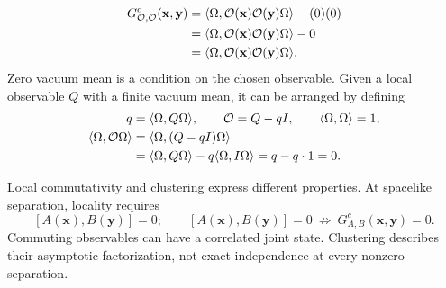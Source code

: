 \begin{align}
 G^c_{\mathcal O,\mathcal O}(\mathbf x,\mathbf y)
 &=\langle\Omega,\mathcal O(\mathbf x)\mathcal O(\mathbf y)\Omega\rangle
     -(0)(0)\notag\\
 &=\langle\Omega,\mathcal O(\mathbf x)\mathcal O(\mathbf y)\Omega\rangle-0
   \notag\\
 &=\langle\Omega,\mathcal O(\mathbf x)\mathcal O(\mathbf y)\Omega\rangle.
 \label{qft:zero-mean-connected-correlation}
\end{align}
Zero vacuum mean is a condition on the chosen observable. Given a local
observable $Q$ with a finite vacuum mean, it can be arranged by defining
\begin{align}
 q&=\langle\Omega,Q\Omega\rangle,\qquad
 \mathcal O=Q-qI,\qquad \langle\Omega,\Omega\rangle=1,\notag\\
 \langle\Omega,\mathcal O\Omega\rangle
 &=\langle\Omega,(Q-qI)\Omega\rangle\notag\\
 &=\langle\Omega,Q\Omega\rangle
   -q\langle\Omega,I\Omega\rangle
   =q-q\cdot1=0.
 \label{qft:observable-centering}
\end{align}

Local commutativity and clustering express different properties. At
spacelike separation, locality requires
\begin{equation}\label{qft:locality-versus-clustering}
 [A(\mathbf x),B(\mathbf y)]=0;
 \qquad
 [A(\mathbf x),B(\mathbf y)]=0
 \ \not\Longrightarrow\ G^c_{A,B}(\mathbf x,\mathbf y)=0.
\end{equation}
Commuting observables can have a correlated joint state. Clustering
describes their asymptotic factorization, not exact independence at every
nonzero separation.

